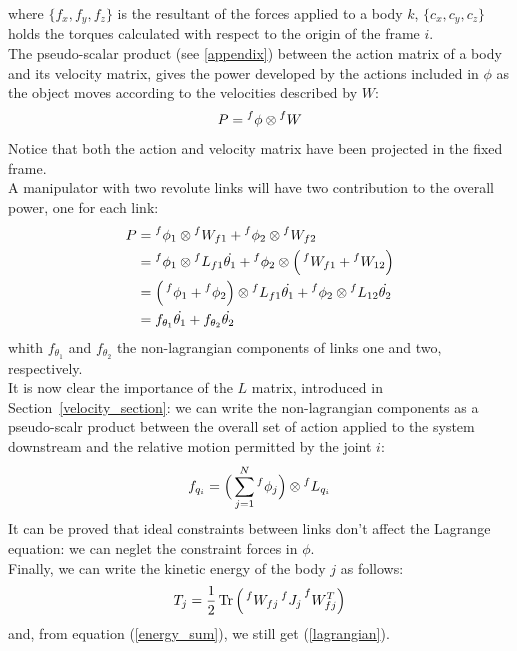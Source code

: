 \documentclass[a4paper,12pt,oneside]{report}
\DeclareMathOperator{\Tr}{Tr}
\begin{document}
where $\{f_x,f_y,f_z\}$ is the resultant of the forces applied to a body $k$, $\{c_x,c_y,c_z\}$ holds the torques calculated with respect to the origin of the frame $i$.\\
The pseudo-scalar product (see \ref{appendix}) between the action matrix of a body and its velocity matrix, gives the power developed by the actions included in $\phi$ as the object moves according to the velocities described by $W$:
\begin{equation}
  P=\prescript{f}{}{\phi}\otimes \prescript{f}{}{W}
\end{equation}
Notice that both the action and velocity matrix have been projected in the fixed frame.\\
A manipulator with two revolute links will have two contribution to the overall power, one for each link:
\begin{equation}
  \begin{split}
  P&=\prescript{f}{}{\phi_1}\otimes \prescript{f}{}{W_{f1}}+\prescript{f}{}{\phi_2}\otimes \prescript{f}{}{W_{f2}}\\
   &=\prescript{f}{}{\phi_1}\otimes \prescript{f}{}{L_{f1}}\dot{\theta_1}+\prescript{f}{}{\phi_2}\otimes \Big(\prescript{f}{}{W_{f1}}+\prescript{f}{}{W_{12}}\Big)\\
   &=\Big(\prescript{f}{}{\phi_1}+\prescript{f}{}{\phi_2}\Big)\otimes\prescript{f}{}{L_{f1}}\dot{\theta_1}+\prescript{f}{}{\phi_2}\otimes \prescript{f}{}{L_{12}}\dot{\theta_2}\\
   &=f_{\theta_1}\dot{\theta_1}+f_{\theta_2}\dot{\theta_2}
  \end{split}
\end{equation}
whith $f_{\theta_1}$ and $f_{\theta_2}$ the non-lagrangian components of links one and two, respectively.\\
It is now clear the importance of the $L$ matrix, introduced in Section~\ref{velocity_section}: we can write the non-lagrangian components as a pseudo-scalr product between the overall set of action applied to the system downstream and the relative motion permitted by the joint $i$:
\begin{equation}
  f_{q_i}=\Big(\sum_{j=1}^N\prescript{f}{}{\phi_j}\Big)\otimes \prescript{f}{}{L_{q_i}}
\label{non_lagrangian_matrix}
\end{equation}
It can be proved that ideal constraints between links don't affect the Lagrange equation: we can neglet the constraint forces in $\phi$.\\

Finally, we can write the kinetic energy of the body $j$ as follows:
\begin{equation}
  T_j=\frac{1}{2}\Tr{\Big(\prescript{f}{}{W_{fj}}\prescript{f}{}{J_j}\prescript{f}{}{W_{fj}^T}\Big)}
  \label{kinetic_matrix}
\end{equation}
and, from equation (\ref{energy_sum}), we still get (\ref{lagrangian}).\\
\end{document}

